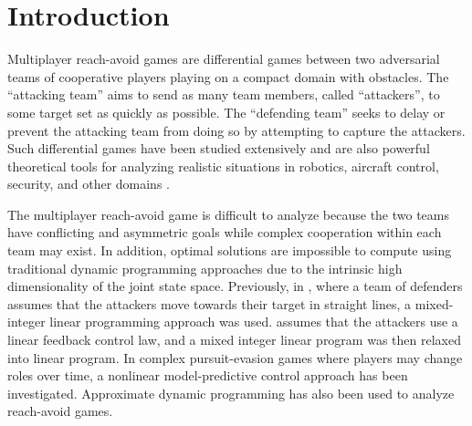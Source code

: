 \section{Introduction}

Multiplayer reach-avoid games are differential games between two adversarial teams of cooperative players playing on a compact domain with obstacles. The ``attacking team'' aims to send as many team members, called ``attackers'', to some target set as quickly as possible. The ``defending team'' seeks to delay or prevent the attacking team from doing so by attempting to capture the attackers. Such differential games have been studied extensively \cite{HThesis, Huang2011} and are also powerful theoretical tools for analyzing realistic situations in robotics, aircraft control, security, and other domains \cite{OFTHEAIRFORCEWASHINGTON:2009p37, Erzberger:2006p44, kiva2009}.


The multiplayer reach-avoid game is difficult to analyze because the two teams have conflicting and asymmetric goals while complex cooperation within each team may exist. In addition, optimal solutions are impossible to compute using traditional dynamic programming approaches due to the intrinsic high dimensionality of the joint state space. Previously, in \cite{Earl:2007p101}, where a team of defenders assumes that the attackers move towards their target in straight lines, a mixed-integer linear programming approach was used. \cite{Chasparis:2005p102} assumes that the attackers use a linear feedback control law, and a mixed integer linear program was then relaxed into linear program. In complex pursuit-evasion games where players may change roles over time, a nonlinear model-predictive control \cite{Sprinkle:2004p100} approach has been investigated. Approximate dynamic programming \cite{McGrew:2008p103} has also been used to analyze reach-avoid games.


